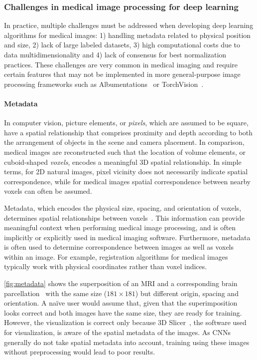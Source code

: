 \subsubsection{Challenges in medical image processing for deep learning}
\label{sec:challenges}


In practice, multiple challenges must be addressed when developing deep learning algorithms for medical images:
1) handling metadata related to physical position and size,
2) lack of large labeled datasets,
3) high computational costs due to data multidimensionality and
4) lack of consensus for best normalization practices.
These challenges are very common in medical imaging and require certain features that may not be implemented in more general-purpose image processing frameworks such as Albumentations~\cite{buslaev_albumentations_2020} or TorchVision~\cite{paszke_pytorch_2019}.


\paragraph{Metadata}
\label{sec:metadata}

In computer vision, picture elements, or \textit{pixels}, which are assumed to be square, have a spatial relationship that comprises proximity and depth according to both the arrangement of objects in the scene and camera placement.
In comparison, medical images are reconstructed such that the location of volume elements, or cuboid-shaped \textit{voxels}, encodes a meaningful 3D spatial relationship.
In simple terms, for 2D natural images, pixel vicinity does not necessarily indicate spatial correspondence, while for medical images spatial correspondence between nearby voxels can often be assumed.

Metadata, which encodes the physical size, spacing, and orientation of voxels, determines spatial relationships between voxels~\cite{larobina_medical_2014}.
This information can provide meaningful context when performing medical image processing, and is often implicitly or explicitly used in medical imaging software.
Furthermore, metadata is often used to determine correspondence between images as well as voxels within an image.
For example, registration algorithms for medical images typically work with physical coordinates rather than voxel indices.

\cref{fig:metadata} shows the superposition of an \ac{MRI} and a corresponding brain parcellation~\cite{cardoso_geodesic_2015} with the same size ($181 \times 181$) but different origin, spacing and orientation.
A naïve user would assume that, given that the superimposition looks correct and both images have the same size, they are ready for training.
However, the visualization is correct only because 3D Slicer~\cite{fedorov_3d_2012}, the software used for visualization, is aware of the spatial metadata of the images.
As \acp{CNN} generally do not take spatial metadata into account, training using these images without preprocessing would lead to poor results.


